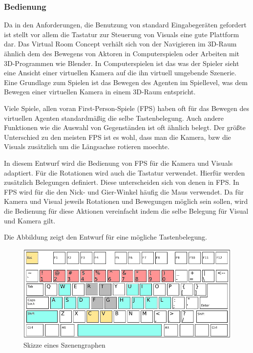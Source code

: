 \subsubsection{Bedienung}

Da in den Anforderungen, die Benutzung von standard Eingabeger\"aten gefordert ist stellt vor allem die
Tastatur zur Steuerung von Visuals eine gute Plattform dar. Das Virtual Room Concept verh\"alt sich von der
Navigieren im 3D-Raum \"ahnlich dem des Bewegens von Aktoren in Computerspielen oder Arbeiten mit 3D-Programmen
wie Blender. In Computerspielen ist das was der Spieler sieht eine Ansicht einer virtuellen Kamera auf die ihn
virtuell umgebende Szenerie. Eine Grundlage zum Spielen ist das Bewegen des Agenten im Spiellevel, was dem
Bewegen einer virtuellen Kamera in einem 3D-Raum entspricht.

Viele Spiele, allen voran First-Person-Spiele (FPS) haben oft f\"ur das Bewegen des virtuellen Agenten standardm\"a\ss{}ig
die selbe Tastenbelegung. Auch andere Funktionen wie die Auswahl von Gegenst\"anden ist oft \"ahnlich belegt.
Der gr\"o\ss{}te Unterschied zu den meisten FPS ist es wohl, dass man die Kamera, bzw die Visuals zus\"atzlich um die
L\"angsachse rotieren moechte.

In diesem Entwurf wird die Bedienung von FPS f\"ur die Kamera und Visuals adaptiert. F\"ur die Rotationen wird
auch die Tastatur verwendet. Hierf\"ur werden zus\"atzlich Belegungen definiert. Diese unterscheiden sich von
denen in FPS. In FPS wird f\"ur die den Nick- und Gier-Winkel h\"aufig die Maus verwendet. Da f\"ur Kamera und
Visual jeweils Rotationen und Bewegungen m\"oglich sein sollen, wird die Bedienung f\"ur diese Aktionen
vereinfacht indem die selbe Belegung f\"ur Visual und Kamera gilt.

Die Abbildung zeigt den Entwurf f\"ur eine m\"ogliche Tastenbelegung.

\begin{figure}[h!]
    \centering
    \includegraphics[width=1\textwidth]{pictures/usage_keyboard_layout1.png}
    \caption{Skizze eines Szenengraphen}
\end{figure}

